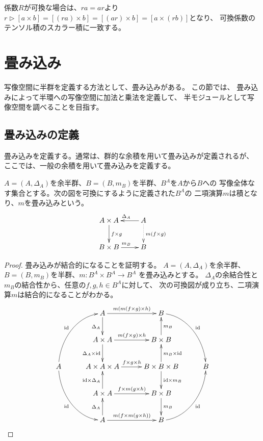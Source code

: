 	係数$R$が可換な場合は、$ra=ar$より
	$r\rhd[a\times b]=[(ra)\times b]=[(ar)\times b]=[a\times (rb)]$となり、
	可換係数のテンソル積のスカラー積に一致する。

\section{畳み込み}\label{s1:畳み込み} %
	写像空間に半群を定義する方法として、畳み込みがある。
	この節では、 畳み込みによって半環への写像空間に加法と乗法を定義して、
	半モジュールとして写像空間を調べることを目指す。

	\subsection{畳み込みの定義}\label{s2:畳み込みの定義} %
		畳み込みを定義する。通常は、群的な余積を用いて畳み込みが定義されるが、
		ここでは、一般の余積を用いて畳み込みを定義する。

		\begin{definition}\label{def:畳み込み} %
			$A=(A,\Delta_A)$を余半群、$B=(B,m_B)$を半群、$B^A$を$A$から$B$への
			写像全体なす集合とする。次の図を可換にするように定義された$B^A$の
			二項演算$m$は積となり、$m$を畳み込みという。
			\begin{equation}\xymatrix{ %
				A \times A \ar[d]^{f \times g} & A \ar[l]_{\Delta_A} \ar@{.>}[d]^{m(f \times g)} \\
				B \times B \ar[r]^{m_B} & B \\
			}\end{equation} %
		\end{definition} %
		\begin{proof} %
			畳み込みが結合的になることを証明する。
			$A=(A,\Delta_A)$を余半群、$B=(B,m_B)$を半群、$m:B^A\times B^A\to B^A$
			を畳み込みとする。
			$\Delta_A$の余結合性と$m_B$の結合性から、任意の$f,g,h\in B^A$に対して、
			次の可換図が成り立ち、二項演算$m$は結合的になることがわかる。
			\begin{equation*}\label{eq:誘導された二項演算の結合性}\xymatrix@C+1ex{
				& A \ar[d]_{\Delta_A} \ar[r]^{m(m(f\times g)\times h)}
				& B \ar@(r,u)[rdd]^{\myid} 
				\\
				& A\times A \ar[d]_{\Delta_A\times \myid} \ar[r]^{m(f\times g)\times h}
				& B\times B \ar[u]_{m_B}
				\\
			A \ar@(u,l)[ruu]^{\myid} \ar@(d,l)[rdd]_{\myid} 
				& A\times A\times A \ar[r]^{f\times g\times h}
				& B\times B\times B \ar[u]_{m_B\times \myid} \ar[d]^{\myid\times m_B}
				& B 
				\\
				& A\times A \ar[u]^{\myid\times \Delta_A} \ar[r]^{f\times m(g\times h)}
				& B\times B \ar[d]^{m_B}
				\\
				& A \ar[u]^{\Delta_A} \ar[r]^{m(f\times m(g\times h))}
				& B \ar@(r,d)[ruu]_{\myid}
			\\
			}\end{equation*}
		\end{proof} %

